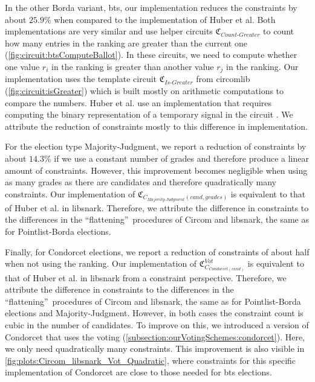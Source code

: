 In the other Borda variant, \gls{bts}, our implementation reduces the constraints by about $25.9\%$ when compared to the implementation of Huber et al.
Both implementations are very similar and use helper circuits $\mathfrak{C}_{Count\text{-}Greater}$ to count how many entries in the ranking are greater than the current one (\cref{fig:circuit:btsComputeBallot}).
In these circuits, we need to compute whether one value $r_i$ in the ranking is greater than another value $r_j$ in the ranking.
Our implementation uses the template circuit $\mathfrak{C}_{Is\text{-}Greater}$ from circomlib \cite{jordy_baylina_iden3circomlib_2025} (\cref{fig:circuit:isGreater}) which is built mostly on arithmetic computations to compare the numbers.
Huber et al. use an implementation that requires computing the binary representation of a temporary signal in the circuit \cite{huber_hicolasnuberballotsnarks_2024}.
We attribute the reduction of constraints mostly to this difference in implementation.

For the election type Majority-Judgment, we report a reduction of constraints by about $14.3\%$ if we use a constant number of grades and therefore produce a linear amount of constraints.
However, this improvement becomes negligible when using as many grades as there are candidates and therefore quadratically many constraints.
Our implementation of $\mathfrak{C}_{C_{Majority\text{-}Judgment}(cand, grades)}$ is equivalent to that of Huber et al. in libsnark.
Therefore, we attribute the difference in constraints to the differences in the ``flattening''\ procedures of Circom and libsnark, the same as for Pointlist-Borda elections.

Finally, for Condorcet elections, we report a reduction of constraints of about half when not using the ranking.
Our implementation of $\mathfrak{C}_{C_{Condorcet(cand)}}^{Vot}$ is equivalent to that of Huber et al. in libsnark from a constraint perspective.
Therefore, we attribute the difference in constraints to the differences in the ``flattening''\ procedures of Circom and libsnark, the same as for Pointlist-Borda elections and Majority-Judgment.
However, in both cases the constraint count is cubic in the number of candidates.
To improve on this, we introduced a version of Condorcet that uses the voting (\cref{subsection:ourVotingSchemes:condorcet}).
Here, we only need quadratically many constraints.
This improvement is also visible in \cref{fig:plots:Circom_libsnark_Vot_Quadratic}, where constraints for this specific implementation of Condorcet are close to those needed for \gls{bts} elections.

